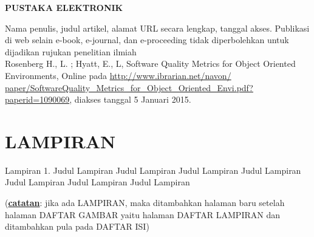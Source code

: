 \documentclass[oneside,listof=totoc]{scrbook}
\begin{document}
\begin{singlespace}
\noindent\textbf{PUSTAKA ELEKTRONIK}\\

\begin{hangparas}{25pt}{1}
Nama penulis, judul artikel, alamat URL secara lengkap, tanggal akses.  Publikasi di web selain e-book, e-journal, dan e-proceeding tidak diperbolehkan untuk dijadikan rujukan penelitian ilmiah\\

Rosenberg H., L. ; Hyatt, E., L, Software Quality Metrics for Object Oriented Environments, Online pada \url{http://www.ibrarian.net/navon/ paper/SoftwareQuality_Metrics_for_Object_Oriented_Envi.pdf?paperid=1090069}, diakses tanggal 5 Januari 2015.\\
\end{hangparas}

\end{singlespace}

\chapter{LAMPIRAN}

\vspace{0.5cm}

\begin{singlespace}
\begin{hangparas}{58pt}{1}
Lampiran 1.	Judul Lampiran Judul Lampiran Judul Lampiran Judul Lampiran Judul Lampiran Judul Lampiran Judul Lampiran
\end{hangparas}

\vspace{0.5cm}

\noindent (\textbf{\underline{catatan}}: jika ada LAMPIRAN, maka ditambahkan halaman baru setelah halaman DAFTAR GAMBAR yaitu halaman DAFTAR LAMPIRAN dan ditambahkan pula pada DAFTAR ISI)
\end{singlespace}
\end{document}
